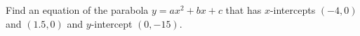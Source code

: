 Find an equation of the parabola $y=ax^2+bx+c$ that has $x$-intercepts $(-4,0)$ and $(1.5,0)$ and $y$-intercept $(0,-15)$.
